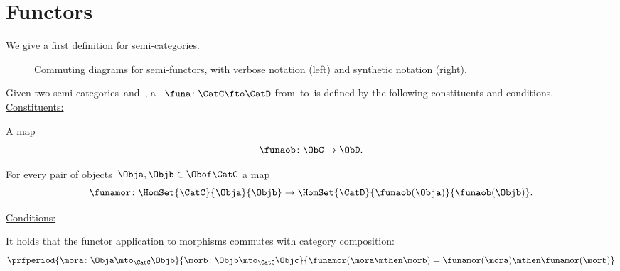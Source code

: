 \section{Functors}

We give a first definition for semi-categories.


\begin{figure*}
    \begin{ctdefinitionshade}
    \end{ctdefinitionshade}
    \caption{Commuting diagrams for semi-functors, with verbose notation (left) and synthetic notation (right).
    }
\end{figure*}

\begin{ctdefinition}
    \label{def:semi-functor}
    Given two semi-categories~\CatC and~\CatD, a \emph{}~$\funa\colon \CatC\fto \CatD$ from~\CatC to~\CatD is defined by the following constituents and conditions.
    \\
    \underline{Constituents:}
    \begin{compactenum}
        [i)]
        \item A map
              \begin{equation}
                  \funaob\colon \ObC \to \ObD.
              \end{equation}
        \item For every pair of objects~$\Obja, \Objb\in \Obof\CatC$ a map
              \begin{equation}
                  \funamor\colon \HomSet{\CatC}{\Obja}{\Objb} \to \HomSet{\CatD}{\funaob(\Obja)}{\funaob(\Objb)}.
              \end{equation}
    \end{compactenum}
    \underline{Conditions:}
    \begin{compactenum}
        \item It holds that the functor application to morphisms commutes with category composition:
              \begin{equation}
                  \prfperiod{
                      \mora\colon \Obja \mto_{\CatC} \Objb
                  }{
                      \morb\colon \Objb \mto_{\CatC} \Objc
                  }{
                      \funamor(\mora \mthen \morb)=\funamor(\mora)\mthen \funamor(\morb)
                  }
              \end{equation}
    \end{compactenum}
\end{ctdefinition}

